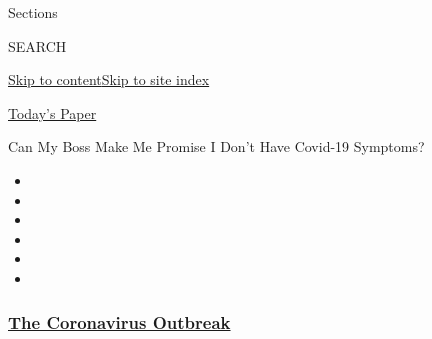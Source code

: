 Sections

SEARCH

\protect\hyperlink{site-content}{Skip to
content}\protect\hyperlink{site-index}{Skip to site index}

\href{https://myaccount.nytimes3xbfgragh.onion/auth/login?response_type=cookie\&client_id=vi}{}

\href{https://www.nytimes3xbfgragh.onion/section/todayspaper}{Today's
Paper}

Can My Boss Make Me Promise I Don't Have Covid-19 Symptoms?

\begin{itemize}
\item
\item
\item
\item
\item
\item
\end{itemize}

\hypertarget{the-coronavirus-outbreak}{%
\subsubsection{\texorpdfstring{\href{https://www.nytimes3xbfgragh.onion/news-event/coronavirus?name=styln-coronavirus-national\&region=TOP_BANNER\&block=storyline_menu_recirc\&action=click\&pgtype=Article\&impression_id=d14a3f50-f1da-11ea-bc3d-b7a508416139\&variant=undefined}{The
Coronavirus
Outbreak}}{The Coronavirus Outbreak}}\label{the-coronavirus-outbreak}}


